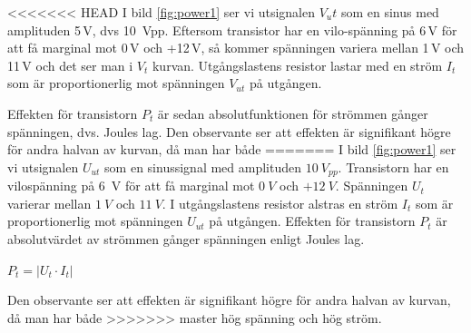 <<<<<<< HEAD
I bild \ref{fig:power1} ser vi utsignalen \(V_ut\) som en sinus med amplituden
5\,V, dvs \SI{10}{Vpp}. Eftersom transistor har en vilo-spänning på 6\,V
för att få marginal mot 0\,V och +12\,V, så kommer spänningen variera
mellan 1\,V och 11\,V och det ser man i \(V_t\) kurvan. Utgångslastens
resistor lastar med en ström \(I_t\) som är proportionerlig mot spänningen
\(V_{ut}\) på utgången.

Effekten för transistorn \(P_t\) är sedan absolutfunktionen för strömmen gånger spänningen, dvs. Joules lag. Den observante ser
att effekten är signifikant högre för andra halvan av kurvan, då man har både
=======
I bild \ref{fig:power1} ser vi utsignalen \(U_{ut}\) som en sinussignal med amplituden
\(10\ V_{pp}\). Transistorn har en vilospänning på 6~V
för att få marginal mot \(0\ V\) och \(+12\ V\). Spänningen \(U_t\) varierar
mellan \(1\ V\) och \(11\ V\). I utgångslastens resistor alstras en ström \(I_t\) som är proportionerlig mot spänningen
\(U_{ut}\) på utgången. Effekten för transistorn \(P_t\) är absolutvärdet av strömmen gånger spänningen enligt Joules lag. 

\(P_t = \lvert U_t \cdot I_t \rvert\) 

Den observante ser att effekten är signifikant högre för andra halvan av kurvan, då man har både
>>>>>>> master
hög spänning och hög ström.
